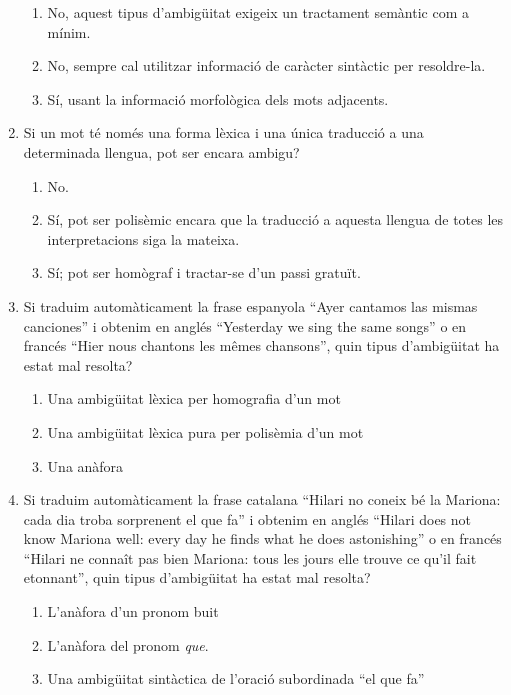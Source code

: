 \begin{enumerate}
\begin{enumerate}
\item No, aquest tipus d'ambigüitat exigeix un tractament semàntic
com a mínim.
\item No, sempre cal utilitzar informació de caràcter sintàctic per
resoldre-la.
\item Sí, usant la informació morfològica dels mots adjacents.
\end{enumerate}

\item Si un mot té només una forma lèxica i una única traducció a
   una determinada llengua, pot ser encara ambigu?
   
\begin{enumerate}
\item No.
\item Sí, pot ser polisèmic encara que la traducció a aquesta
      llengua de totes les interpretacions siga la mateixa.
\item Sí; pot ser homògraf i tractar-se d'un passi gratuït.
\end{enumerate}
\item Si traduim automàticament la frase espanyola ``Ayer cantamos
   las mismas canciones'' i obtenim en anglés ``Yesterday we sing
   the same songs'' o en francés ``Hier nous chantons les mêmes
   chansons'', quin tipus d'ambigüitat ha estat mal resolta? 
   
\begin{enumerate}
\item Una ambigüitat lèxica per homografia d'un mot
\item Una ambigüitat lèxica pura per polisèmia d'un mot
\item Una anàfora
\end{enumerate}
\item Si traduim automàticament la frase catalana ``Hilari no
   coneix bé la Mariona: cada dia troba sorprenent el que fa'' i
   obtenim en anglés ``Hilari does not know Mariona well: every day he
   finds what he does astonishing'' o en francés ``Hilari ne connaît
   pas bien Mariona: tous les jours elle trouve ce qu'il fait
   etonnant'', quin tipus d'ambigüitat ha estat mal resolta?
   
\begin{enumerate}
\item L'anàfora d'un pronom buit
\item L'anàfora del pronom \emph{que}.
\item Una ambigüitat sintàctica de l'oració subordinada ``el que fa''
\end{enumerate}


\end{enumerate}

